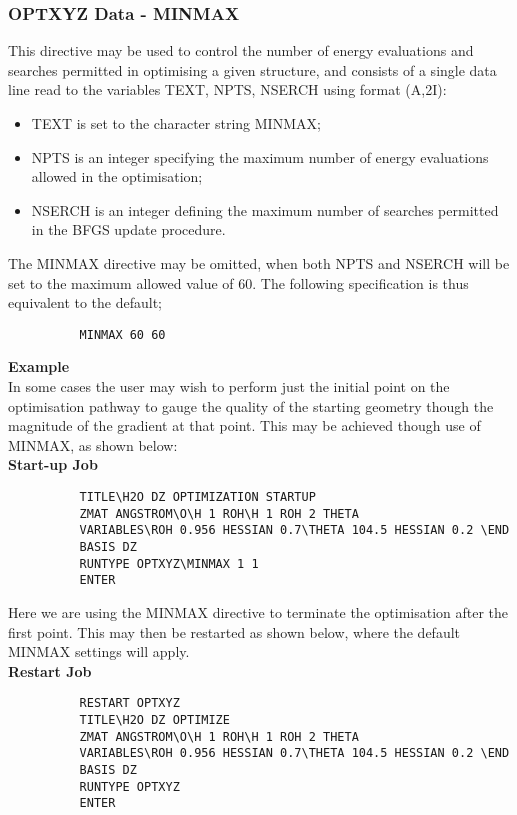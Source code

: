 \documentclass[11pt,fleqn]{article}
\begin{document}
\subsubsection[OPTXYZ Data - MINMAX]{OPTXYZ Data - MINMAX}

This directive may be used to
control the number of energy evaluations and searches permitted
in optimising a given structure, and consists of a single 
data line read to the variables TEXT, NPTS, NSERCH using format (A,2I):
\begin{itemize}
\item TEXT is set to the character string MINMAX;
\item NPTS is an integer specifying  the maximum number of 
energy evaluations allowed in the optimisation;
\item NSERCH is an integer defining the maximum number of searches
permitted in the BFGS update procedure.
\end{itemize}
The MINMAX directive may be omitted, when both NPTS and NSERCH will
be set to the maximum allowed value of 60. 
The following specification is thus 
equivalent to the default;

{
\footnotesize
\begin{verbatim}
          MINMAX 60 60
\end{verbatim}
}
{\bf Example}\\

In some cases the user may wish to perform just the
initial point on the optimisation pathway to gauge the quality
of the starting geometry though the magnitude of the gradient at
that point. This may be achieved though use of MINMAX, as shown
below:\\

{\bf Start-up Job}
{
\footnotesize
\begin{verbatim}
          TITLE\H2O DZ OPTIMIZATION STARTUP
          ZMAT ANGSTROM\O\H 1 ROH\H 1 ROH 2 THETA
          VARIABLES\ROH 0.956 HESSIAN 0.7\THETA 104.5 HESSIAN 0.2 \END
          BASIS DZ
          RUNTYPE OPTXYZ\MINMAX 1 1
          ENTER
\end{verbatim}
}
Here we are using the MINMAX directive to terminate the
optimisation after the first point. This may then be restarted
as shown below, where the default MINMAX settings will apply.\\

{\bf Restart Job}
{
\footnotesize
\begin{verbatim}
          RESTART OPTXYZ
          TITLE\H2O DZ OPTIMIZE
          ZMAT ANGSTROM\O\H 1 ROH\H 1 ROH 2 THETA 
          VARIABLES\ROH 0.956 HESSIAN 0.7\THETA 104.5 HESSIAN 0.2 \END
          BASIS DZ
          RUNTYPE OPTXYZ
          ENTER
\end{verbatim}
}
\end{document}
